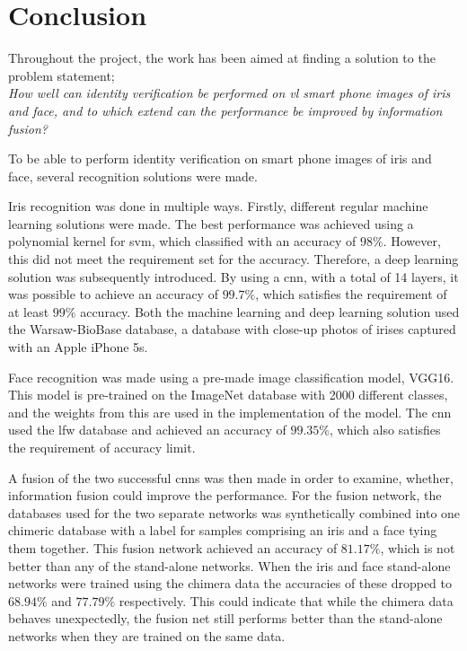 \chapter{Conclusion}\label{ch:conclusion}\glsresetall
Throughout the project, the work has been aimed at finding a solution to the problem statement; \\
\textit{How well can identity verification be performed on \gls{vl} smart phone images of iris and face, and to which extend can the performance be improved by information fusion?}

To be able to perform identity verification on smart phone images of iris and face, several recognition solutions were made.

Iris recognition was done in multiple ways. Firstly, different regular machine learning solutions were made. The best performance was achieved using a polynomial kernel for \gls{svm}, which classified with an accuracy of $98\%$. However, this did not meet the requirement set for the accuracy. Therefore, a deep learning solution was subsequently introduced. By using a \gls{cnn}, with a total of 14 layers, it was possible to achieve an accuracy of $99.7\%$, which satisfies the requirement of at least $99\%$ accuracy. 
Both the machine learning and deep learning solution used the Warsaw-BioBase database, a database with close-up photos of irises captured with an Apple iPhone 5s.

Face recognition was made using a pre-made image classification model, VGG16. This model is pre-trained on the ImageNet database with 2000 different classes, and the weights from this are used in the implementation of the model. The \gls{cnn} used the \gls{lfw} database and achieved an accuracy of $99.35\%$, which also satisfies the requirement of accuracy limit.

A fusion of the two successful \gls{cnn}s was then made in order to examine, whether, information fusion could improve the performance. For the fusion network, the databases used for the two separate networks was synthetically combined into one chimeric database with a label for samples comprising an iris and a face tying them together. This fusion network achieved an accuracy of $81.17\%$, which is not better than any of the stand-alone networks. When the iris and face stand-alone networks were trained using the chimera data the accuracies of these dropped to $68.94\%$ and $77.79\%$ respectively. This could indicate that while the chimera data behaves unexpectedly, the fusion net still performs better than the stand-alone networks when they are trained on the same data.